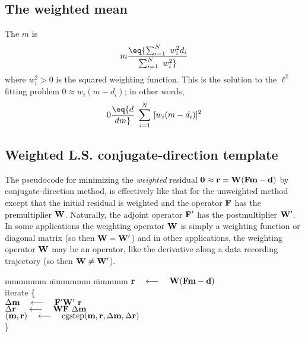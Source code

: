 \subsection{The weighted mean}
The  $m$ is
\begin{equation}
m \eq
{\sum_{i=1}^N \ w_i^2 d_i  \over
 \sum_{i=1}^N \ w_i^2
 }
\end{equation}
where $w_i^2>0$ is the squared weighting function.
This is the solution to the $\ell^2$ fitting problem
$ 0  \approx w_i (m - d_i)$;
in other words,
\begin{equation}
0 \eq {d \over dm} \ \sum_{i=1}^N \ [w_i(m - d_i)]^2
\end{equation}

\subsection{Weighted L.S. conjugate-direction template}
The pseudocode for minimizing the {\it weighted} residual
$\bold 0\approx \bold r = \bold W (\bold F \bold m - \bold d)$
by conjugate-direction method,
is effectively like that for the unweighted method
except that the initial residual is weighted
and the operator $\bold F$ has the premultiplier $\bold W$.
Naturally, the adjoint operator $\bold F'$
has the postmultiplier $\bold W'$.
In some applications the weighting operator $\bold W$
is simply a weighting function or diagonal matrix
(so then $\bold W = \bold W'$)
and in other applications, the weighting operator $\bold W$
may be an operator,
like the derivative along a data recording trajectory
(so then $\bold W \ne \bold W'$).
\def\padarrow{\quad\longleftarrow\quad}
\begin{tabbing}
mmmmmm \= mmmmmm \= mmmmm \kill
\> $\bold r \padarrow \bold W (\bold F \bold m - \bold d)$     \\
\> {\rm iterate \{ }                                            \\
\>      \>  $\Delta\bold m  \padarrow \bold F'\bold W'\         \bold r$ \\
\>      \>  $\Delta\bold r\ \padarrow \bold W \bold F \  \Delta \bold m$ \\
\>      \>  $(\bold m,\bold r) \padarrow {\rm cgstep}
            (\bold m,\bold r, \Delta\bold m,\Delta\bold r )$ \\
\>      \> \}                                           
\end{tabbing}

